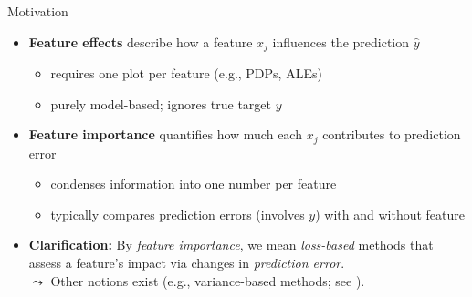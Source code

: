 \documentclass[11pt,compress,t,notes=noshow, aspectratio=169, xcolor=table]{beamer}
\begin{document}
\begin{frame}{Motivation}
\begin{itemize}
  \item<1-3> \textbf{Feature effects} describe how a feature $x_j$ influences the prediction $\hat{y}$
  \begin{itemize}
    \item requires one plot per feature (e.g., PDPs, ALEs)
    \item purely model-based; ignores true target $y$ %
  \end{itemize}
  \item<2-3> \textbf{Feature importance} quantifies how much each $x_j$ contributes to prediction error%
  \begin{itemize}
    \item condenses information into one number per feature
    \item typically compares prediction errors (involves $y$) with and without feature
  \end{itemize}
  \item<3> \textbf{Clarification:} By \emph{feature importance}, we mean \emph{loss-based} methods that assess a feature's impact via changes in \emph{prediction error}. \\
  $\leadsto$
  Other notions exist (e.g., variance-based methods; see ).
\end{itemize}
\end{frame}
\end{document}
